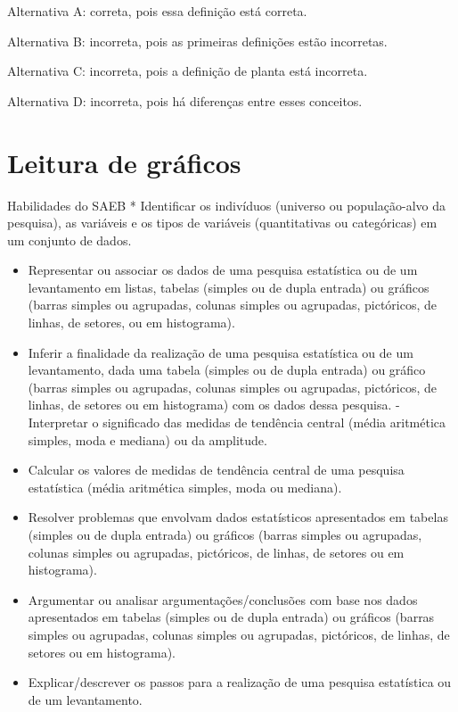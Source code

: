 Alternativa A: correta, pois essa definição está correta.

Alternativa B: incorreta, pois as primeiras definições estão incorretas.

Alternativa C: incorreta, pois a definição de planta está incorreta.

Alternativa D: incorreta, pois há diferenças entre esses conceitos.

\chapter{Leitura de gráficos}

Habilidades do SAEB * Identificar os indivíduos (universo ou
população-alvo da pesquisa), as variáveis e os tipos de variáveis
(quantitativas ou categóricas) em um conjunto de dados.

\begin{itemize}
\item
  Representar ou associar os dados de uma pesquisa estatística ou de um
  levantamento em listas, tabelas (simples ou de dupla entrada) ou
  gráficos (barras simples ou agrupadas, colunas simples ou agrupadas,
  pictóricos, de linhas, de setores, ou em histograma).
\item
  Inferir a finalidade da realização de uma pesquisa estatística ou de
  um levantamento, dada uma tabela (simples ou de dupla entrada) ou
  gráfico (barras simples ou agrupadas, colunas simples ou agrupadas,
  pictóricos, de linhas, de setores ou em histograma) com os dados dessa
  pesquisa. - Interpretar o significado das medidas de tendência central
  (média aritmética simples, moda e mediana) ou da amplitude.
\item
  Calcular os valores de medidas de tendência central de uma pesquisa
  estatística (média aritmética simples, moda ou mediana).
\item
  Resolver problemas que envolvam dados estatísticos apresentados em
  tabelas (simples ou de dupla entrada) ou gráficos (barras simples ou
  agrupadas, colunas simples ou agrupadas, pictóricos, de linhas, de
  setores ou em histograma).
\item
  Argumentar ou analisar argumentações/conclusões com base nos dados
  apresentados em tabelas (simples ou de dupla entrada) ou gráficos
  (barras simples ou agrupadas, colunas simples ou agrupadas,
  pictóricos, de linhas, de setores ou em histograma).
\item
  Explicar/descrever os passos para a realização de uma pesquisa
  estatística ou de um levantamento.
\end{itemize}

